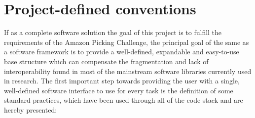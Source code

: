 \section{Project-defined conventions} \label{sec:standards}
If as a complete software solution the goal of this project is to
fulfill the requirements of the Amazon Picking Challenge, the
principal goal of the same as a software framework is to provide a
well-defined, expandable and easy-to-use base structure which can
compensate the fragmentation and lack of interoperability found in
most of the mainstream software libraries currently used in
research. The first important step towards providing the user with a
single, well-defined software interface to use for every task is the
definition of some standard practices, which have been used through
all of the code stack and are hereby presented:

